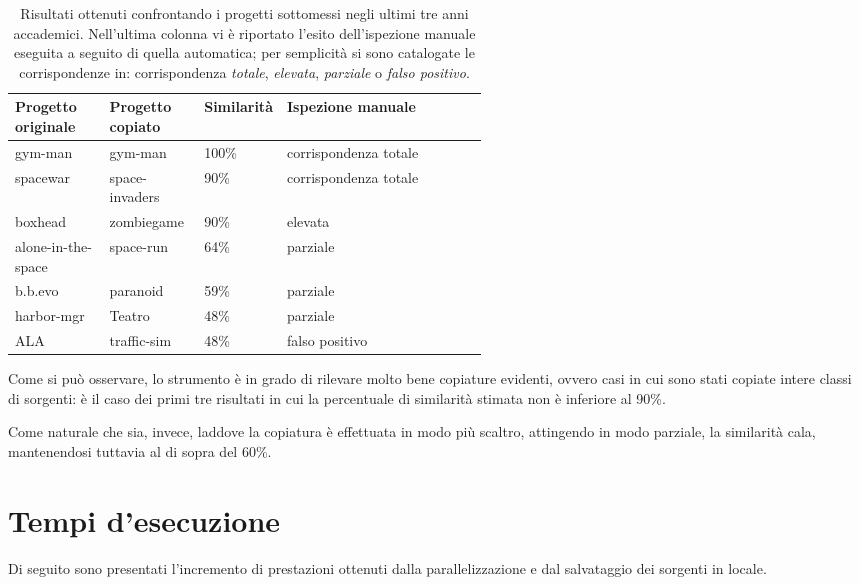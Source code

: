 \begin{table}[h!]
    \centering
    \begin{tabular}{|p{0.2\linewidth}|p{0.2\linewidth}|p{0.15\linewidth}|p{}|}
        \hline
        \textbf{Progetto originale} & \textbf{Progetto copiato} & \textbf{Similarità} & \textbf{Ispezione manuale} \\ [0.5ex] 
        \hline\hline
        gym-man & gym-man & 100\% & corrispondenza totale \\
        \hline
        spacewar & space-invaders & 90\% & corrispondenza totale \\
        \hline
        boxhead & zombiegame & 90\% & elevata \\
        \hline
        alone-in-the-space & space-run & 64\% & parziale \\
        \hline
        b.b.evo & paranoid & 59\% & parziale \\
        \hline
        harbor-mgr & Teatro & 48\% & parziale \\
        \hline
        ALA & traffic-sim & 48\% & falso positivo \\
        \hline
    \end{tabular}
    \caption[Risultati ottenuti confrontando i progetti sottomessi negli ultimi tre anni accademici]{Risultati ottenuti confrontando i progetti sottomessi negli ultimi tre anni accademici. Nell'ultima colonna vi è riportato l'esito dell'ispezione manuale eseguita a seguito di quella automatica; per semplicità si sono catalogate le corrispondenze in: corrispondenza \textit{totale}, \textit{elevata}, \textit{parziale} o \textit{falso positivo}.}
    \label{table:results}
\end{table}

Come si può osservare, lo strumento è in grado di rilevare molto bene copiature evidenti, ovvero casi in cui sono stati copiate intere classi di sorgenti: è il caso dei primi tre risultati in cui la percentuale di similarità stimata non è inferiore al 90\%.

Come naturale che sia, invece, laddove la copiatura è effettuata in modo più scaltro, attingendo in modo parziale, la similarità cala, mantenendosi tuttavia al di sopra del 60\%.

\section{Tempi d'esecuzione}
Di seguito sono presentati l'incremento di prestazioni ottenuti dalla parallelizzazione e dal salvataggio dei sorgenti in locale.



